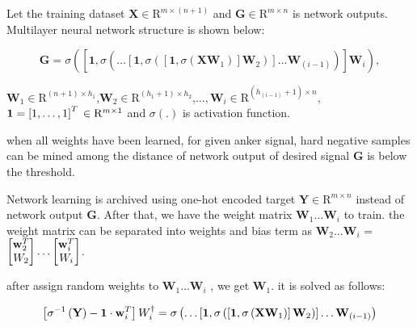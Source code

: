 \documentclass[runningheads]{llncs}
\begin{document}
Let the training dataset $\mathbf{X}\in{\mathrm{R}}^{m \times (n+1)}$ and $\mathbf{G}\in{\mathrm{R}}^{m \times n}$ is network outputs.
Multilayer neural network structure is shown below:

\begin{equation}
    \mathbf{G} = \sigma\left(\left[\mathbf{1},\sigma\left(\dots\left[\mathbf{1},\sigma\left(\left[\mathbf{1},\sigma\left(\mathbf{X}\mathbf{W}_{1}\right)\right]\mathbf{W}_{2}\right)\right]\dots\mathbf{W}_{(i-1)}\right)\right]\mathbf{W}_{i}\right),
\end{equation}

$\mathbf{W}_{1}\in{\mathrm{R}}^{(n+1) \times h_{1}}$,$\mathbf{W}_{2}\in{\mathrm{R}}^{(h_{1}+1) \times h_{2}}$,$\dots,\mathbf{W}_{i}\in{\mathrm{R}}^{(h_{(i-1)}+1) \times n}$,$\mathbf{1}=\left[1,\dots,1\right]^{T}\\
\in{\mathrm{R}}^{m \times 1}$ and $\sigma(.)$ is activation function.

when all weights have been learned, for given anker signal, hard negative samples can be mined among the distance of network output of desired signal $\mathbf{G}$ is below the threshold.

Network learning is archived using one-hot encoded target $\mathbf{Y}\in{\mathrm{R}}^{m \times n}$ instead of network output $\mathbf{G}$.
After that, we have the weight matrix $\mathbf{W}_{1}\dots\mathbf{W}_{i}$ to train. the weight matrix can be separated into weights and bias term as
$\mathbf{W}_{2}\dots\mathbf{W}_{i}$ = 
$\begin{bmatrix}
\mathbf{w}_{2}^{T}\\\mathnormal{W}_{2}
\end{bmatrix}
\dots
\begin{bmatrix}
\mathbf{w}_{i}^{T}\\\mathnormal{W}_{i}
\end{bmatrix}$.

after assign random weights to $\mathbf{W}_{1}\dots\mathbf{W}_{i}$ , we get $\mathbf{W}_{1}$. it is solved as follows:

\begin{equation}
    \left[\sigma^{-1}\left(\mathbf{Y}\right)-\mathbf{1}\cdot\mathbf{w}_{i}^{T}\right]\mathnormal{W}_{i}^\dagger = 
    \sigma\left(\dots\left[\mathbf{1},\sigma\left(\left[\mathbf{1},\sigma\left(\mathbf{X}\mathbf{W}_{1}\right)\right]\mathbf{W}_{2}\right)\right]\dots\mathbf{W}_{(i-1)}\right)
\end{equation}
\end{document}
